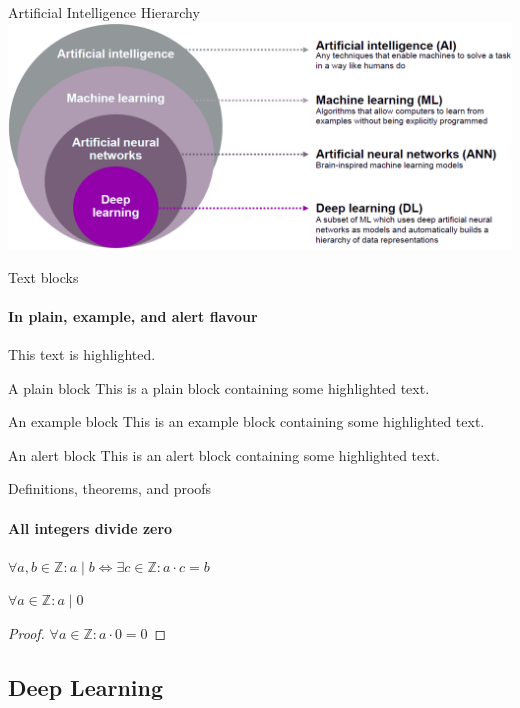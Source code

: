 \documentclass{beamer}
\begin{document}
    \begin{frame}{Artificial Intelligence Hierarchy}
        \includegraphics{resources/hierarchy}
    \end{frame}
    \begin{frame}[label=simmonshall]{Text blocks}
      \framesubtitle{In plain, example, and \alert{alert} flavour}
      \alert{This text} is highlighted.

      \begin{block}{A plain block}
        This is a plain block containing some \alert{highlighted text}.
      \end{block}
      \begin{exampleblock}{An example block}
        This is an example block containing some \alert{highlighted text}.
      \end{exampleblock}
      \begin{alertblock}{An alert block}
        This is an alert block containing some \alert{highlighted text}.
      \end{alertblock}
    \end{frame}

    \begin{frame}[label=proof]{Definitions, theorems, and proofs}
      \framesubtitle{All integers divide zero}
      \begin{definition}
        $\forall a,b\in\mathds{Z}: a\mid b\iff\exists c\in\mathds{Z}:a\cdot c=b$
      \end{definition}
      \begin{theorem}
        $\forall a\in\mathds{Z}: a\mid 0$
      \end{theorem}
      \begin{proof}[Proof\nopunct]
        $\forall a\in\mathds{Z}: a\cdot 0=0$
      \end{proof}
    \end{frame}

    \subsection{Deep Learning}
    
\end{document}
